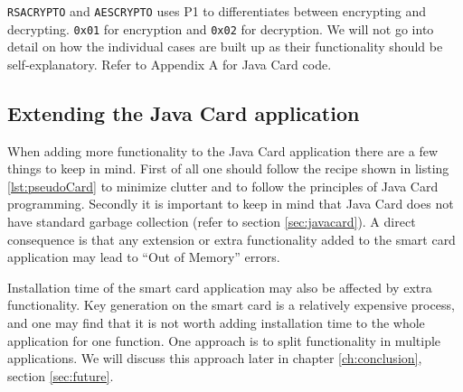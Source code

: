 \texttt{RSACRYPTO} and \texttt{AESCRYPTO} uses P1 to differentiates between encrypting and decrypting. \texttt{0x01} for encryption and \texttt{0x02} for decryption.
We will not go into detail on how the individual cases are built up as their functionality should be self-explanatory. Refer to Appendix A for Java Card code.

\subsection{Extending the Java Card application}
When adding more functionality to the Java Card application there are a few things to keep in mind. First of all one should follow the recipe shown in listing \ref{lst:pseudoCard} to minimize clutter and to follow the principles of Java Card programming. Secondly it is important to keep in mind that Java Card does not have standard garbage collection (refer to section \ref{sec:javacard}). A direct consequence is that any extension or extra functionality added to the smart card application may lead to ``Out of Memory'' errors.

Installation time of the smart card application may also be affected by extra functionality. Key generation on the smart card is a relatively expensive process, and one may find that it is not worth adding installation time to the whole application for one function. One approach is to split functionality in multiple applications. We will discuss this approach later in chapter \ref{ch:conclusion}, section \ref{sec:future}.
